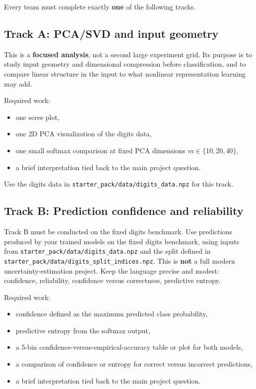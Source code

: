 \documentclass[11pt]{article}
\newcommand{\filepath}[1]{\nolinkurl{#1}}
\begin{document}
Every team must complete exactly \textbf{one} of the following tracks.

\subsection{Track A: PCA/SVD and input geometry}

This is a \textbf{focused analysis}, not a second large experiment grid. Its purpose is to study input geometry and dimensional compression before classification, and to compare linear structure in the input to what nonlinear representation learning may add.

Required work:

\begin{itemize}
    \item one scree plot,
    \item one 2D PCA visualization of the digits data,
    \item one small softmax comparison at fixed PCA dimensions \(m \in \{10,20,40\}\),
    \item a brief interpretation tied back to the main project question.
\end{itemize}

Use the digits data in \filepath{starter_pack/data/digits_data.npz} for this track.

\subsection{Track B: Prediction confidence and reliability}

Track B must be conducted on the fixed digits benchmark. Use predictions produced by your trained models on the fixed digits benchmark, using inputs from \filepath{starter_pack/data/digits_data.npz} and the split defined in \filepath{starter_pack/data/digits_split_indices.npz}. This is \textbf{not} a full modern uncertainty-estimation project. Keep the language precise and modest: confidence, reliability, confidence versus correctness, predictive entropy.

Required work:

\begin{itemize}
    \item confidence defined as the maximum predicted class probability,
    \item predictive entropy from the softmax output,
    \item a 5-bin confidence-versus-empirical-accuracy table or plot for both models,
    \item a comparison of confidence or entropy for correct versus incorrect predictions,
    \item a brief interpretation tied back to the main project question.
\end{itemize}
\end{document}
